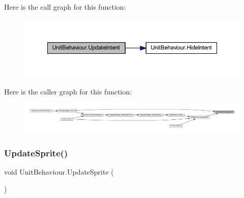 Here is the call graph for this function\+:\nopagebreak
\begin{figure}[H]
\begin{center}
\leavevmode
\includegraphics[width=350pt]{class_unit_behaviour_a38efbe995d8d2f3c522cb2fa076e79cc_cgraph}
\end{center}
\end{figure}
Here is the caller graph for this function\+:\nopagebreak
\begin{figure}[H]
\begin{center}
\leavevmode
\includegraphics[width=350pt]{class_unit_behaviour_a38efbe995d8d2f3c522cb2fa076e79cc_icgraph}
\end{center}
\end{figure}
\mbox{\label{class_unit_behaviour_a559fdec9ef2c1c1a6c1a863cb868bce5}} 
\subsubsection{\texorpdfstring{UpdateSprite()}{UpdateSprite()}}
{\footnotesize\ttfamily void Unit\+Behaviour.\+Update\+Sprite (\begin{DoxyParamCaption}{ }\end{DoxyParamCaption})}

